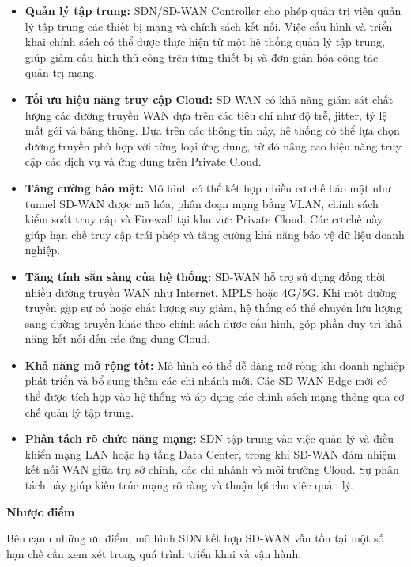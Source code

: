 \begin{itemize}
    \item \textbf{Quản lý tập trung:} 
    SDN/SD-WAN Controller cho phép quản trị viên quản lý tập trung các thiết bị mạng và chính sách kết nối. Việc cấu hình và triển khai chính sách có thể được thực hiện từ một hệ thống quản lý tập trung, giúp giảm cấu hình thủ công trên từng thiết bị và đơn giản hóa công tác quản trị mạng.

    \item \textbf{Tối ưu hiệu năng truy cập Cloud:} 
    SD-WAN có khả năng giám sát chất lượng các đường truyền WAN dựa trên các tiêu chí như độ trễ, jitter, tỷ lệ mất gói và băng thông. Dựa trên các thông tin này, hệ thống có thể lựa chọn đường truyền phù hợp với từng loại ứng dụng, từ đó nâng cao hiệu năng truy cập các dịch vụ và ứng dụng trên Private Cloud.

    \item \textbf{Tăng cường bảo mật:} 
    Mô hình có thể kết hợp nhiều cơ chế bảo mật như tunnel SD-WAN được mã hóa, phân đoạn mạng bằng VLAN, chính sách kiểm soát truy cập và Firewall tại khu vực Private Cloud. Các cơ chế này giúp hạn chế truy cập trái phép và tăng cường khả năng bảo vệ dữ liệu doanh nghiệp.

    \item \textbf{Tăng tính sẵn sàng của hệ thống:} 
    SD-WAN hỗ trợ sử dụng đồng thời nhiều đường truyền WAN như Internet, MPLS hoặc 4G/5G. Khi một đường truyền gặp sự cố hoặc chất lượng suy giảm, hệ thống có thể chuyển lưu lượng sang đường truyền khác theo chính sách được cấu hình, góp phần duy trì khả năng kết nối đến các ứng dụng Cloud.

    \item \textbf{Khả năng mở rộng tốt:} 
    Mô hình có thể dễ dàng mở rộng khi doanh nghiệp phát triển và bổ sung thêm các chi nhánh mới. Các SD-WAN Edge mới có thể được tích hợp vào hệ thống và áp dụng các chính sách mạng thông qua cơ chế quản lý tập trung.

    \item \textbf{Phân tách rõ chức năng mạng:} 
    SDN tập trung vào việc quản lý và điều khiển mạng LAN hoặc hạ tầng Data Center, trong khi SD-WAN đảm nhiệm kết nối WAN giữa trụ sở chính, các chi nhánh và môi trường Cloud. Sự phân tách này giúp kiến trúc mạng rõ ràng và thuận lợi cho việc quản lý.
\end{itemize}


\textbf{Nhược điểm}

Bên cạnh những ưu điểm, mô hình SDN kết hợp SD-WAN vẫn tồn tại một số hạn chế cần xem xét trong quá trình triển khai và vận hành:


